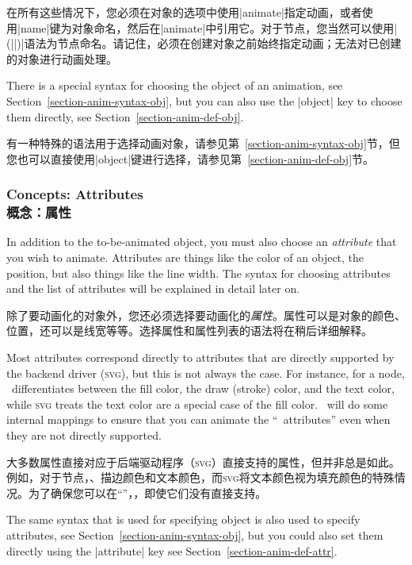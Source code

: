 在所有这些情况下，您必须在对象的选项中使用|animate|指定动画，或者使用|name|键为对象命名，然后在|animate|中引用它。对于节点，您当然可以使用|(||)|语法为节点命名。请记住，必须在创建对象之前始终指定动画；无法对已创建的对象进行动画处理。

There is a special syntax for choosing the object of an animation, see
Section~\ref{section-anim-syntax-obj}, but you can also use the |object| key to
choose them directly, see Section~\ref{section-anim-def-obj}.

有一种特殊的语法用于选择动画对象，请参见第~\ref{section-anim-syntax-obj}节，但您也可以直接使用|object|键进行选择，请参见第~\ref{section-anim-def-obj}节。


\subsubsection{Concepts: Attributes\\概念：属性}

In addition to the to-be-animated object, you must also choose an
\emph{attribute} that you wish to animate. Attributes are things like the color
of an object, the position, but also things like the line width. The syntax for
choosing attributes and the list of attributes will be explained in detail
later on.

除了要动画化的对象外，您还必须选择要动画化的\emph{属性}。属性可以是对象的颜色、位置，还可以是线宽等等。选择属性和属性列表的语法将在稍后详细解释。

Most attributes correspond directly to attributes that are directly supported
by the backend driver (\textsc{svg}), but this is not always the case. For
instance, for a node, \tikzname\ differentiates between the fill color, the
draw (stroke) color, and the text color, while \textsc{svg} treats the text
color are a special case of the fill color. \tikzname\ will do some internal
mappings to ensure that you can animate the ``\tikzname\ attributes'' even when
they are not directly supported.

大多数属性直接对应于后端驱动程序（\textsc{svg}）直接支持的属性，但并非总是如此。例如，对于节点，\tikzname{}、描边颜色和文本颜色，而\textsc{svg}将文本颜色视为填充颜色的特殊情况。为了确保您可以在\tikzname{}“\tikzname{}”，\tikzname{}，即使它们没有直接支持。

The same syntax that is used for specifying object is also used to specify
attributes, see Section~\ref{section-anim-syntax-obj}, but you could also set
them directly using the |attribute| key see
Section~\ref{section-anim-def-attr}.

